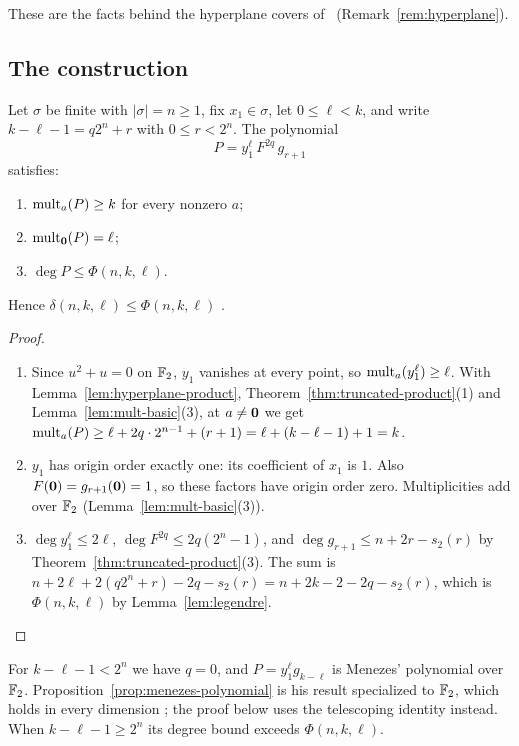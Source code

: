 These are the facts behind the hyperplane covers of~\cite{BBDM23}
(Remark~\ref{rem:hyperplane}).

\subsection{The construction}

\begin{theorem}\label{thm:construction}
Let \(\sigma\) be finite with \(|\sigma|=n\ge1\), fix \(x_1\in\sigma\), let
\(0\le\ell<k\), and write \(k-\ell-1=q2^n+r\) with \(0\le r<2^n\). The polynomial
\[
 P=y_1^{\ell}\,F^{2q}\,g_{r+1}
\]
satisfies:
\begin{enumerate}
 \item \(\operatorname{mult}_a(P)\ge k\) for every nonzero \(a\);
 \item \(\operatorname{mult}_{\mathbf 0}(P)=\ell\);
 \item \(\deg P\le\Phi(n,k,\ell)\).
\end{enumerate}
Hence \(\delta(n,k,\ell)\le\Phi(n,k,\ell)\)
.
\end{theorem}

\begin{proof}
\begin{enumerate}
 \item Since \(u^2+u=0\) on \(\mathbb F_2\), \(y_1\) vanishes at every point, so
 \(\operatorname{mult}_a(y_1^\ell)\ge\ell\). With Lemma~\ref{lem:hyperplane-product},
 Theorem~\ref{thm:truncated-product}(1) and Lemma~\ref{lem:mult-basic}(3), at
 \(a\ne\mathbf 0\) we get
 \(\operatorname{mult}_a(P)\ge\ell+2q\cdot2^{n-1}+(r+1)=\ell+(k-\ell-1)+1=k\).
 \item \(y_1\) has origin order exactly one: its coefficient of \(x_1\) is \(1\).
 Also \(F(\mathbf 0)=g_{r+1}(\mathbf 0)=1\), so these factors have origin order zero.
 Multiplicities add over \(\mathbb F_2\) (Lemma~\ref{lem:mult-basic}(3)).
 \item \(\deg y_1^\ell\le2\ell\), \(\deg F^{2q}\le2q(2^n-1)\), and
 \(\deg g_{r+1}\le n+2r-s_2(r)\) by Theorem~\ref{thm:truncated-product}(3). The
 sum is \(n+2\ell+2(q2^n+r)-2q-s_2(r)=n+2k-2-2q-s_2(r)\), which is
 \(\Phi(n,k,\ell)\) by Lemma~\ref{lem:legendre}. \qedhere
\end{enumerate}
\end{proof}

For \(k-\ell-1<2^n\) we have \(q=0\), and \(P=y_1^\ell g_{k-\ell}\) is Menezes'
polynomial over \(\mathbb F_2\). Proposition~\ref{prop:menezes-polynomial} is his result
specialized to \(\mathbb F_2\), which holds in every dimension \cite[Theorem~3.2 and
Section~8]{Men26}; the proof below uses the telescoping identity instead. When
\(k-\ell-1\ge2^n\) its degree bound exceeds \(\Phi(n,k,\ell)\).


